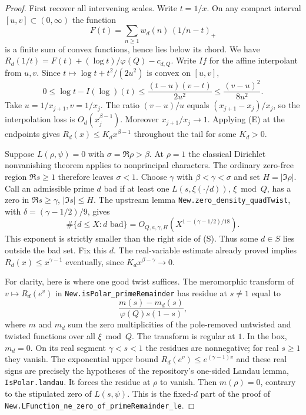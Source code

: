 \begin{proof}
First recover all intervening scales. Write $t=1/x$. On any compact interval
$[u,v]\subset(0,\infty)$ the function
\[
 F(t)=\sum_{n\ge1}w_d(n)\,(1/n-t)_+
\]
is a finite sum of convex functions, hence lies below its chord. We have
$R_d(1/t)=F(t)+(\log t)/\varphi(Q)-c_{d,Q}$. Write $I f$ for the affine
interpolant from $u,v$. Since $t\mapsto\log t+t^2/(2u^2)$ is convex on
$[u,v]$,
\[
 0\le\log t-I(\log)(t)
 \le\frac{(t-u)(v-t)}{2u^2}
 \le\frac{(v-u)^2}{8u^2}.
\]
Take $u=1/x_{j+1}, v=1/x_j$. The ratio $(v-u)/u$ equals
$(x_{j+1}-x_j)/x_j$, so the interpolation loss is
$O_d(x_j^{\beta-1})$. Moreover $x_{j+1}/x_j\to1$. Applying (E) at
the endpoints gives $R_d(x)\le K_d x^{\beta-1}$ throughout the tail for
some $K_d>0$.

Suppose $L(\rho,\psi)=0$ with $\sigma=\Re\rho>\beta$. At $\rho=1$
the classical Dirichlet nonvanishing theorem applies to nonprincipal
characters. The ordinary zero-free region $\Re s\ge1$ therefore leaves
$\sigma<1$. Choose $\gamma$ with $\beta<\gamma<\sigma$ and
set $H=|\Im\rho|$. Call an admissible prime $d$ bad if at least one
$L(s,\xi(\cdot/d))$, $\xi\bmod Q$, has a zero in
$\Re s\ge\gamma$, $|\Im s|\le H$. The upstream lemma
\texttt{New.zero\_density\_quadTwist}, with
$\delta=(\gamma-1/2)/9$, gives
\[
 \#\{d\le X:d\text{ bad}\}
   = O_{Q,a,\gamma,H}(X^{1-(\gamma-1/2)/18}).
\]
This exponent is strictly smaller than the right side of (S).
Thus some $d\in S$ lies outside the bad set. Fix this $d$.
The real-variable estimate already proved implies
$R_d(x)\le x^{\gamma-1}$ eventually, since $K_d x^{\beta-\gamma}\to0$.

For clarity, here is where one good twist suffices. The meromorphic
transform of $v\mapsto R_d(e^v)$ in \texttt{New.isPolar\_primeRemainder}
has residue at $s\ne1$ equal to
\[
 \frac{m(s)-m_d(s)}{\varphi(Q)s(1-s)},
\]
where $m$ and $m_d$ sum the zero multiplicities of the pole-removed
untwisted and twisted functions over all $\xi\bmod Q$. The transform is
regular at $1$. In the box, $m_d=0$. On its real segment
$\gamma<s<1$ the residues are nonnegative; for real $s\ge1$ they
vanish. The exponential upper bound $R_d(e^v)\le e^{(\gamma-1)v}$
and these real signs are precisely the hypotheses of the repository's
one-sided Landau lemma, \texttt{IsPolar.landau}. It forces the residue
at $\rho$ to vanish. Then $m(\rho)=0$, contrary to the stipulated zero of
$L(s,\psi)$. This is the fixed-$d$ part of the proof of
\texttt{New.LFunction\_ne\_zero\_of\_primeRemainder\_le}.
\end{proof}

